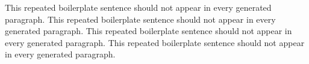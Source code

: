 \documentclass{article}
\begin{document}
This repeated boilerplate sentence should not appear in every generated paragraph.
This repeated boilerplate sentence should not appear in every generated paragraph.
This repeated boilerplate sentence should not appear in every generated paragraph.
This repeated boilerplate sentence should not appear in every generated paragraph.
\end{document}
